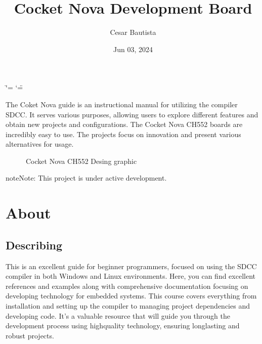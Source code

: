 \documentclass[letterpaper,10pt,english]{sphinxmanual}
\title{Cocket Nova Development Board}
\date{Jun 03, 2024}
\author{Cesar Bautista}
\begin{document}
\ifdefined\shorthandoff
  \ifnum\catcode`\=\string=\active\shorthandoff{=}\fi
  \ifnum\catcode`\"=\active{}\fi
\fi

\pagestyle{empty}
\sphinxmaketitle
\pagestyle{plain}
\sphinxtableofcontents
\pagestyle{normal}
\label{\detokenize{index::doc}}


\sphinxAtStartPar
{}

\sphinxAtStartPar
The Coket Nova guide is an instructional manual for utilizing the compiler SDCC. It serves various purposes, allowing users to explore different features and obtain new projects and
configurations.
The Cocket Nova CH552 boards are incredibly easy to use. The projects focus on innovation and
present various alternatives for usage.

\begin{figure}[htbp]
\centering
\capstart

\noindent{}
\caption{Cocket Nova CH552 Desing graphic}\label{\detokenize{index:id1}}\label{\detokenize{index:ch552}}\end{figure}

\begin{sphinxadmonition}{note}{Note:}
\sphinxAtStartPar
This project is under active development.
\end{sphinxadmonition}

\sphinxstepscope


\chapter{About}
\label{\detokenize{about:about}}\label{\detokenize{about::doc}}

\section{Describing}
\label{\detokenize{about:describing}}
\sphinxAtStartPar
This is an excellent guide for beginner programmers, focused on using the SDCC compiler in both Windows and Linux environments.
Here, you can find excellent references and examples along with comprehensive documentation focusing on developing technology for embedded systems.
This course covers everything from installation and setting up the compiler to managing project dependencies and developing code. It’s a valuable resource that will guide you through the development process using high\sphinxhyphen{}quality technology, ensuring long\sphinxhyphen{}lasting and robust projects.
\end{document}
